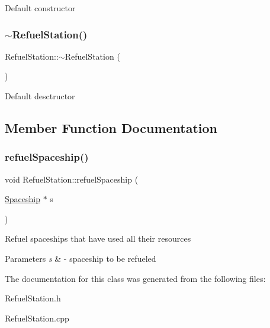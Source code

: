 Default constructor \mbox{\label{classRefuelStation_afc0ebc020ef08d8a6a2096bdb2f3e314}} 
\subsubsection{\texorpdfstring{$\sim$\+Refuel\+Station()}{~RefuelStation()}}
{\footnotesize\ttfamily Refuel\+Station\+::$\sim$\+Refuel\+Station (\begin{DoxyParamCaption}{ }\end{DoxyParamCaption})}

Default desctructor 

\subsection{Member Function Documentation}
\mbox{\label{classRefuelStation_a1b14f9c75c883e3288c52a32b2bbd8a4}} 
\subsubsection{\texorpdfstring{refuel\+Spaceship()}{refuelSpaceship()}}
{\footnotesize\ttfamily void Refuel\+Station\+::refuel\+Spaceship (\begin{DoxyParamCaption}\item[{\hyperlink{classSpaceship}{Spaceship} $\ast$}]{s }\end{DoxyParamCaption})}

Refuel spaceships that have used all their resources 
\begin{DoxyParams}{Parameters}
{\em s} & -\/ spaceship to be refueled \\
\hline
\end{DoxyParams}


The documentation for this class was generated from the following files\+:\begin{DoxyCompactItemize}
\item 
Refuel\+Station.\+h\item 
Refuel\+Station.\+cpp\end{DoxyCompactItemize}
